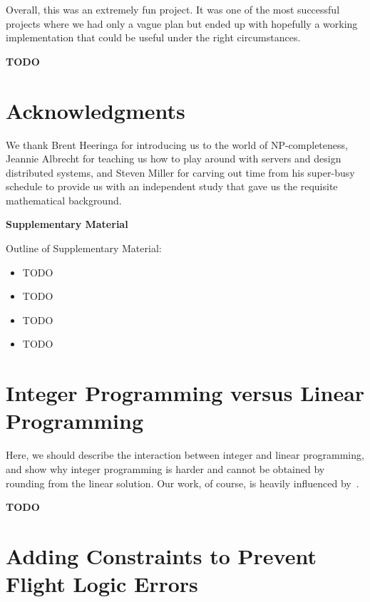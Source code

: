 \documentclass{article}
\begin{document}
Overall, this was an extremely fun project. It was one of the most successful projects where we had only a vague plan but ended up with hopefully a
working implementation that could be useful under the right circumstances.

{\bf TODO}

\section*{Acknowledgments}
 
We thank Brent Heeringa for introducing us to the world of NP-completeness, Jeannie Albrecht for teaching us how to play around with servers and
design distributed systems, and Steven Miller for carving out time from his super-busy schedule to provide us with an independent study that gave us
the requisite mathematical background.











\onecolumn

\appendix

\begin{center}
{\Large \textbf{Supplementary Material}}
\end{center}

Outline of Supplementary Material:

\begin{itemize}[noitemsep]
    \item TODO
    \item TODO
    \item TODO
    \item TODO
\end{itemize}


\section{Integer Programming versus Linear Programming}\label{app:lin_vs_int}

Here, we should describe the interaction between integer and linear programming, and show why integer programming is harder and cannot be obtained by
rounding from the linear solution. Our work, of course, is heavily influenced by~\cite{stevenmiller}.

{\bf TODO}

\section{Adding Constraints to Prevent Flight Logic Errors}\label{app:flight_logic}
\end{document}
